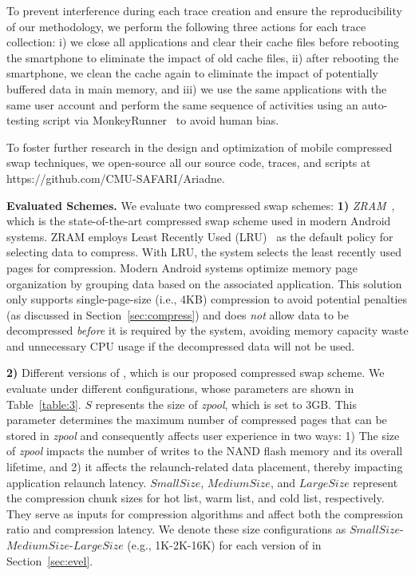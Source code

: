 To prevent interference during each trace creation and ensure the reproducibility of our methodology, we perform the following three actions for each trace collection: i) we close all applications and clear their cache files before rebooting the smartphone to eliminate the impact of old cache files, ii) after rebooting the smartphone, we clean the cache again to eliminate the impact of potentially buffered data in main memory, and iii) we use the same applications with the same user account and perform the same sequence of activities using an auto-testing script via MonkeyRunner~\cite{monkey} to avoid human bias.

To foster further research in the design and optimization of mobile compressed swap techniques, we open-source all our source code, traces, and scripts at https://github.com/CMU-SAFARI/Ariadne.



\noindent\textbf{Evaluated Schemes.} We evaluate two compressed swap schemes:
\noindent\textbf{ 1)} \emph{ZRAM}~\cite{zram1, zram2, new-zram, merge-zram}, which is the state-of-the-art compressed swap scheme used in modern Android systems. ZRAM employs Least Recently Used (LRU)~\cite{LRU} as the default policy for selecting data to compress. With LRU, the system selects the least recently used pages for compression. Modern Android systems optimize memory page organization by grouping data based on the associated application. This solution only supports single-page-size (i.e., 4KB) compression to avoid potential penalties (as discussed in Section~\ref{sec:compress}) and does  \emph{not} allow data to be decompressed \emph{before} it is required by the system, avoiding memory capacity waste and unnecessary CPU usage if the decompressed data will not be used.

\noindent\textbf{2)} Different versions of \proposal, which is our proposed compressed swap scheme. We evaluate \proposal under different configurations, whose parameters are shown in Table~\ref{table:3}.
$S$ represents the size of  \emph{zpool}, which is set to 3GB. This parameter determines the maximum number of compressed pages that can be stored in  \emph{zpool} and consequently affects user experience in two ways: 1) The size of \emph{zpool} impacts the number of writes to the NAND flash memory 
and its overall lifetime, and 2) it affects the relaunch-related data placement, thereby impacting application relaunch latency.
$Small Size$, $Medium Size$, and $Large Size$ represent the compression chunk sizes for hot list, warm list, and cold list, respectively. They serve as inputs for compression algorithms and affect both the compression ratio and compression latency. We denote these size configurations as $Small Size$\--$Medium Size$\--$Large Size$ (e.g., 1K-2K-16K) for each version of \proposal in Section~\ref{sec:evel}.


